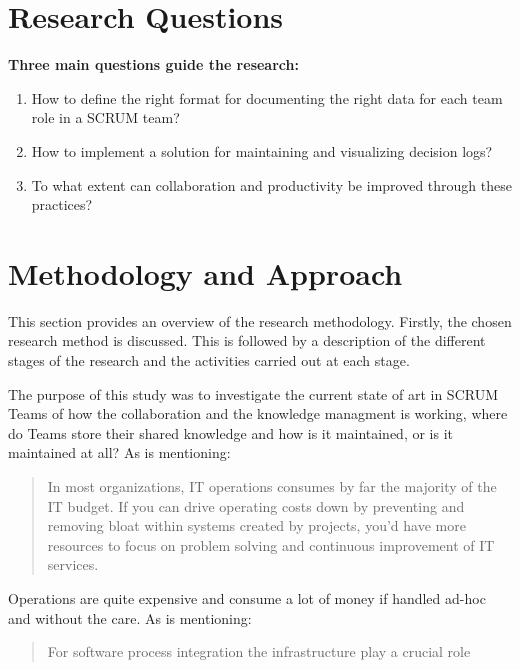 \section{Research Questions}

\textbf{Three main questions guide the research:}
\begin{enumerate}[start=0,label={(\bfseries R\arabic*):}]
\item How to define the right format for documenting the right data for each team role in a SCRUM team?
\item How to implement a solution for maintaining and visualizing decision logs?
\item To what extent can collaboration and productivity be improved through these practices?
\end{enumerate}


\section{Methodology and Approach}

This section provides an overview of the research methodology. Firstly, the chosen research method is discussed. This is followed by a description of the different stages of the research and the activities carried out at each stage.

The purpose of this study was to investigate the current state of art in SCRUM Teams of how the collaboration and the knowledge managment is working, where do Teams store their shared knowledge and how is it maintained, or is it maintained at all? As \cite{HumbleMolesky2011} is mentioning:

\begin{quote}
In most organizations, IT operations
consumes by far the majority of the IT budget. If you
can drive operating costs down by preventing and
removing bloat within systems created by projects,
you’d have more resources to focus on problem solving
and continuous improvement of IT services.
\end{quote}

Operations are quite expensive and consume a lot of money if handled ad-hoc and without the care. As \cite{Azad2023DevOps} is mentioning:

\begin{quote}
For software process integration the infrastructure play a crucial role
\end{quote}

